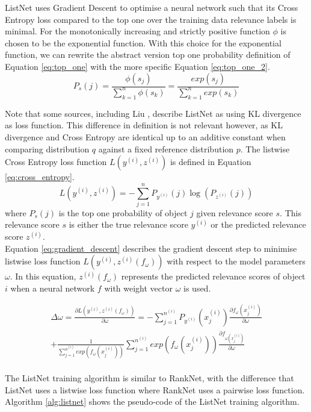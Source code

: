 ListNet uses Gradient Descent to optimise a neural network such that its Cross Entropy loss compared to the top one over the training data relevance labels is minimal. For the monotonically increasing and strictly positive function $\phi$ is chosen to be the exponential function. With this choice for the exponential function, we can rewrite the abstract version top one probability definition of Equation \ref{eq:top_one} with the more specific Equation \ref{eq:top_one_2}.\\
\begin{equation}
P_s(j) = \frac{\phi(s_j)}{\sum\nolimits_{k=1}^{n}\phi(s_k)} = \frac{exp(s_j)}{\sum\nolimits_{k=1}^{n}exp(s_k)}
\label{eq:top_one_2}
\end{equation}

Note that some sources, including Liu \cite{Liu2007}, describe ListNet as using \ac{KL divergence} as loss function. This difference in definition is not relevant however, as \ac{KL divergence} and Cross Entropy are identical up to an additive constant when comparing distribution $q$ against a fixed reference distribution $p$. The listwise Cross Entropy loss function $L(y^{(i)},z^{(i)})$ is defined in Equation \ref{eq:cross_entropy}.
\begin{equation}
L(y^{(i)},z^{(i)}) = -\sum\limits_{j=1}^{n}P_{y^{(i)}}(j)\log(P_{z^{(i)}}(j))
\label{eq:cross_entropy}
\end{equation}
where $P_s(j)$ is the top one probability of object $j$ given relevance score $s$. This relevance score $s$ is either the true relevance score $y^{(i)}$ or the predicted relevance score $z^{(i)}$.\\

\noindent Equation \ref{eq:gradient_descent} describes the gradient descent step to minimise listwise loss function $L(y^{(i)},z^{(i)}(f_\omega))$ with respect to the model parameters $\omega$. In this equation, $z^{(i)}(f_\omega)$ represents the predicted relevance scores of object $i$ when a neural network $f$ with weight vector $\omega$ is used.

\begin{multline}
\Delta\omega = \frac{\partial L(y^{(i)},z^{(i)}(f_\omega))}{\partial \omega} = - \sum\limits_{j=1}^{n^{(i)}}P_{y^{(i)}}(x_{j}^{(i)})\frac{\partial f_{\omega}(x_{j}^{(i)})}{\partial\omega} \\ 
+ \frac{1}{\sum\nolimits_{j=1}^{n^{(i)}}exp(f_{\omega}(x_{j}^{(i)}))} \sum\limits_{j=1}^{n^{(i)}}exp(f_{\omega}(x_{j}^{(i)})) \frac{\partial f_{\omega(x_{j}^{(i)})}}{\partial\omega}
\label{eq:gradient_descent}
\end{multline}
\\
The ListNet training algorithm is similar to RankNet, with the difference that ListNet uses a listwise loss function where RankNet uses a pairwise loss function. Algorithm \ref{alg:listnet} shows the pseudo-code of the ListNet training algorithm.\\


